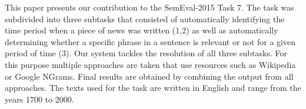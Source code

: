 This paper presents our contribution to the SemEval-2015 Task 7. The task was subdivided into three subtasks that consisted of automatically identifying the time period when a piece of news was written (1,2) as well as automatically determining whether a specific phrase in a sentence is relevant or not for a given period of time (3). Our system tackles the resolution of all three subtasks. For this purpose multiple approaches are taken that use resources such as Wikipedia or Google NGrams. Final results are obtained by combining the output from all approaches. The texts used for the task are written in English and range from the years 1700 to 2000.
